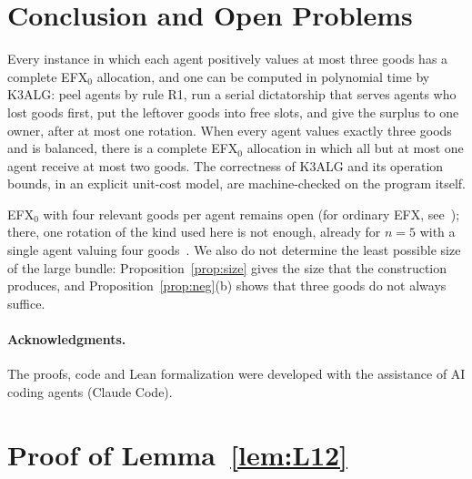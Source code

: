 \documentclass[runningheads,11pt]{llncs}
\newcommand{\efxz}{\texorpdfstring{\mbox{EFX$_0$}}{EFX0}}
\begin{document}
\section{Conclusion and Open Problems}\label{sec:concl}

Every instance in which each agent positively values at most three goods has a complete \efxz{} allocation, and one can be computed in polynomial time by K3ALG: peel agents by rule R1, run a serial dictatorship that serves agents who lost goods first, put the leftover goods into free slots, and give the surplus to one owner, after at most one rotation. When every agent values exactly three goods and is balanced, there is a complete \efxz{} allocation in which all but at most one agent receive at most two goods. The correctness of K3ALG and its operation bounds, in an explicit unit-cost model, are machine-checked on the program itself.

\efxz{} with four relevant goods per agent remains open (for ordinary EFX, see~\cite{ViswanathanM24}); there, one rotation of the kind used here is not enough, already for $n=5$ with a single agent valuing four goods~\cite{Repo}. We also do not determine the least possible size of the large bundle: Proposition~\ref{prop:size} gives the size that the construction produces, and Proposition~\ref{prop:neg}(b) shows that three goods do not always suffice.

\paragraph{Acknowledgments.} The proofs, code and Lean formalization were developed with the assistance of AI coding agents (Claude Code).




\clearpage
\appendix

\section{Proof of Lemma~\ref{lem:L12}}\label{app:L12}
\end{document}
